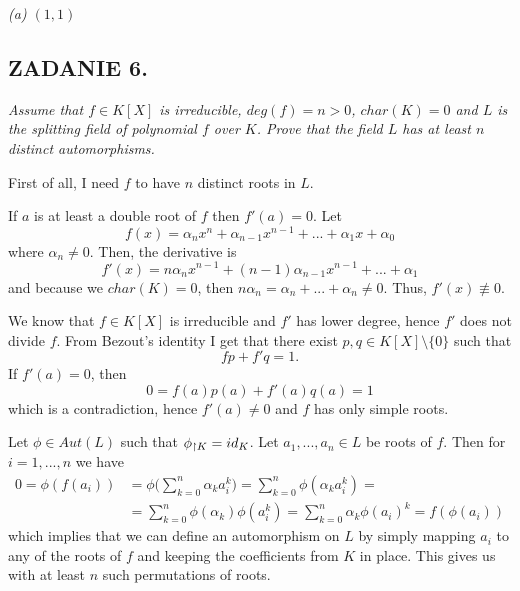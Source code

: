 \documentclass{article}
\begin{document}
\emph{\color{pink}(a) $(1, 1)$}

\subsection*{ZADANIE 6.}
\emph{\color{pink}Assume that $f\in K[X]$ is irreducible, $deg(f)=n>0$, $char(K)=0$ and $L$ is the splitting field of polynomial $f$ over $K$. Prove that the field $L$ has at least $n$ distinct automorphisms.}
\smallskip

First of all, I need $f$ to have $n$ distinct roots in $L$. 




If $a$ is at least a double root of $f$ then $f'(a)=0$. Let
$$f(x)=\alpha_nx^n+\alpha_{n-1}x^{n-1}+...+\alpha_1x+\alpha_0$$
where $\alpha_n\neq 0$. Then, the derivative is
$$f'(x)=n\alpha_nx^{n-1}+(n-1)\alpha_{n-1}x^{n-1}+...+\alpha_1$$
and because we $char(K)=0$, then $n\alpha_n=\alpha_n+...+\alpha_n\neq 0$. Thus, $f'(x)\not\equiv 0$.

We know that $f\in K[X]$ is irreducible and $f'$ has lower degree, hence $f'$ does not divide $f$. From Bezout's identity I get that there exist $p, q\in K[X]\setminus\{0\}$ such that
$$fp+f'q=1.$$
If $f'(a)=0$, then
$$0=f(a)p(a)+f'(a)q(a)=1$$
which is a contradiction, hence $f'(a)\neq 0$ and $f$ has only simple roots.

Let $\phi\in Aut(L)$ such that $\phi_{\upharpoonright K}=id_K$. Let $a_1,...,a_n\in L$ be roots of $f$. Then for $i=1,...,n$ we have
\begin{align*}
    0=\phi(f(a_i))&=\phi\Big(\sum\limits_{k=0}^n\alpha_ka_i^k\Big)=\sum\limits_{k=0}^n\phi(\alpha_ka^k_i)=\\
    &=\sum\limits_{k=0}^n\phi(\alpha_k)\phi(a_i^k)=\sum\limits_{k=0}^n\alpha_k\phi(a_i)^k=f(\phi(a_i))
\end{align*}
which implies that we can define an automorphism on $L$ by simply mapping $a_i$ to any of the roots of $f$ and keeping the coefficients from $K$ in place. This gives us with at least $n$ such permutations of roots.
\end{document}
